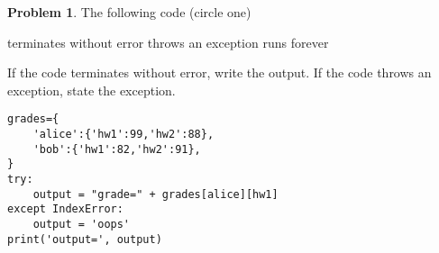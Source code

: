 \documentclass[10pt]{article}
\theoremstyle{definition}
\newtheorem{problem}{Problem}
\begin{document}
\begin{problem}
    The following code (circle one)

    \vspace{0.25in}
    \hspace{0.5in}terminates without error 
    \hspace{1in}throws an exception
    \hspace{1in}runs forever
    \vspace{0.25in}

    \noindent
    If the code terminates without error, write the output.
    If the code throws an exception, state the exception.
\end{problem}
\begin{lstlisting}
grades={
    'alice':{'hw1':99,'hw2':88},
    'bob':{'hw1':82,'hw2':91},
}
try:
    output = "grade=" + grades[alice][hw1]
except IndexError:
    output = 'oops'
print('output=', output)
\end{lstlisting}
\vspace{1.5in}
\end{document}
